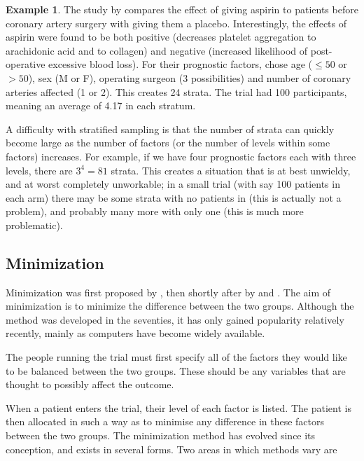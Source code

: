 \documentclass[
  openany]{book}
\theoremstyle{definition}
\theoremstyle{definition}
\newtheorem{example}{Example}[chapter]
\theoremstyle{definition}
\theoremstyle{definition}
\theoremstyle{remark}
\begin{document}
\begin{example}
The study by \citet{kallis1994pre} compares the effect of giving aspirin to patients before coronary artery surgery with giving them a placebo. Interestingly, the effects of aspirin were found to be both positive (decreases platelet aggregation to arachidonic acid and to collagen) and negative (increased likelihood of post-operative excessive blood loss).
For their prognostic factors, \citet{kallis1994pre} chose age (\(\leq{50}\) or \(>50\)), sex (M or F), operating surgeon (3 possibilities) and number of coronary arteries affected (1 or 2). This creates 24 strata. The trial had 100 participants, meaning an average of 4.17 in each stratum.
\end{example}

A difficulty with stratified sampling is that the number of strata can quickly become large as the number of factors (or the number of levels within some factors) increases. For example, if we have four prognostic factors each with three levels, there are \(3^4=81\) strata. This creates a situation that is at best unwieldy, and at worst completely unworkable; in a small trial (with say 100 patients in each arm) there may be some strata with no patients in (this is actually not a problem), and probably many more with only one (this is much more problematic).

\subsection{Minimization}\label{minimization}

Minimization was first proposed by \citet{taves1974minimization}, then shortly after by \citet{pocock1975sequential} and \citet{freedman1976use}. The aim of minimization is to minimize the difference between the two groups. Although the method was developed in the seventies, it has only gained popularity relatively recently, mainly as computers have become widely available.

The people running the trial must first specify all of the factors they would like to be balanced between the two groups. These should be any variables that are thought to possibly affect the outcome.

When a patient enters the trial, their level of each factor is listed. The patient is then allocated in such a way as to minimise any difference in these factors between the two groups. The minimization method has evolved since its conception, and exists in several forms. Two areas in which methods vary are
\end{document}
